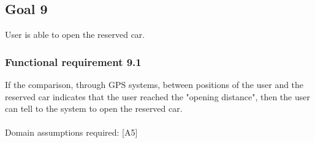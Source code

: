 \subsection{Goal 9}
User is able to open the reserved car.

\setcounter{secnumdepth}{3}
\subsubsection{Functional requirement 9.1}
If the comparison, through GPS systems, between positions of the user and the reserved car indicates that the user reached the "opening distance", then the user can tell to the system to open the reserved car.\\~\\
\noindent Domain assumptions required: [A5]